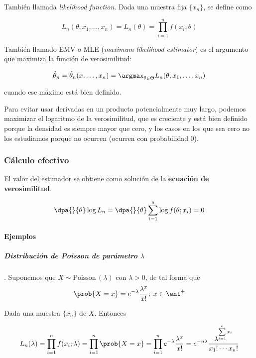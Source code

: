\documentclass{apuntes}
\begin{document}
\begin{defn} También llamada \textit{likelihood function}. Dada una muestra fija $\{x_n\}$, se define como

\[ L_n(\theta;x_1,\dotsc,x_n) = L_n(\theta) = \prod_{i=1}^n f(x_i;\theta) \]
\end{defn}

\begin{defn}\label{defEMV} También llamado EMV o MLE (\textit{maximum likelihood estimator}) es el argumento que maximiza la función de verosimilitud:

\[ \hat{\theta}_n = \hat{\theta}_n(x,\dotsc,x_n) = \argmax_{\theta\in\Theta} L_n(\theta;x_1,\dotsc,x_n) \]

cuando ese máximo está bien definido.
\end{defn}

Para evitar usar derivadas en un producto potencialmente muy largo, podemos maximizar el logaritmo de la verosimilitud, que es creciente y está bien definido porque la densidad es siempre mayor que cero, y los casos en los que sea cero no los estudiamos porque no ocurren (ocurren con probabilidad 0).

\subsubsection{Cálculo efectivo}

El valor del estimador se obtiene como solución de la  \textbf{ecuación de verosimilitud}.

\[ \dpa{}{\theta}\log L_n = \dpa{}{\theta}\sum_{i=1}^n\log f(\theta;x_i) = 0 \]

\paragraph{Ejemplos}

\subparagraph{Distribución de Poisson de parámetro $\lambda$}. Suponemos que $X\sim \text{Poisson}\,(\lambda)$ con $\lambda > 0$, de tal forma que
\label{ejEmvPoisson}
\[ \prob{X = x} = e ^{-\lambda}\frac{\lambda^x}{x!}; \; x\in \ent^+ \]

Dada una muestra $\{x_n\}$ de $X$. Entonces

\[
L_n(\lambda) =
\prod_{i=1}^n f(x_i;\lambda) =
\prod_{i=1}^n \prob{X=x} =
\prod_{i=1}^n e ^{-\lambda}\frac{\lambda^x}{x!} =
e^{-n\lambda}\frac{\lambda^{\sum\limits_{i=1}^nx_i}}{x_1!\dotsb x_n!}
\]
\end{document}
